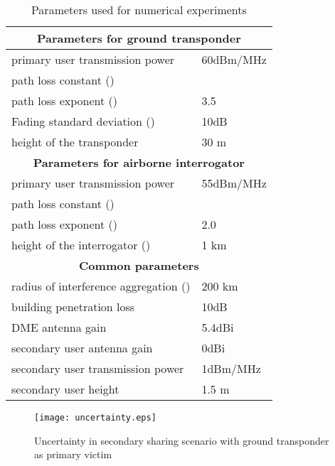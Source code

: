 \documentclass[12pt,submission,journal,onecolumn]{IEEEtran}
\begin{document}




\begin{table}[ht]
\renewcommand{\arraystretch}{1.1}
\centering
\caption{Parameters used for numerical experiments}\label{tab:param}
  \begin{tabular}{l|l}
    \hline\hline
    \multicolumn{2}{c}{\textbf{Parameters for ground transponder}}\\
    \hline
    primary user transmission power & 60dBm/MHz\\
    \hline
    path loss constant () & \\
    \hline
    path loss exponent () & 3.5\\
    \hline
    Fading standard deviation () & 10dB\\
    \hline
    height of the transponder & 30 m\\
    \hline\hline
    \multicolumn{2}{c}{\textbf{Parameters for airborne interrogator}}\\
    \hline
    primary user transmission power & 55dBm/MHz\\
    \hline
    path loss constant () & \\
    \hline
    path loss exponent () & 2.0\\
    \hline
    height of the interrogator () & 1 km\\
    \hline\hline
    \multicolumn{2}{c}{\textbf{Common parameters}}\\
    \hline
    radius of interference aggregation () & 200 km\\
    \hline
    building penetration loss & 10dB\\
    \hline
    DME antenna gain & 5.4dBi\\
    \hline
    secondary user antenna gain & 0dBi\\
    \hline
    secondary user transmission power & 1dBm/MHz\\
    \hline
    secondary user height & 1.5 m\\
    \hline
  \end{tabular}
\end{table}

\begin{figure}[ht]
  \centering \texttt{[image: uncertainty.eps]}\\
  \centering \caption{Uncertainty in secondary sharing scenario with ground transponder as primary victim}
  \label{fig:GroundScenario}
\end{figure}
\end{document}
